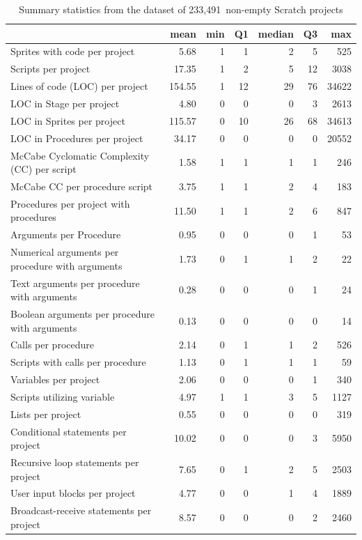\documentclass{sig-alternate}
\newcommand{\nScriptPrograms}{233,491}
\begin{document}
\begin{table}[ht]
	\centering
	\begin{tabular}{lrrrrrr}
		\hline
		&\textbf{mean}&\textbf{min}&\textbf{Q1}&\textbf{median}&\textbf{Q3}&\textbf{max}\\
		\hline
		Sprites with code per project&5.68&1&1&2&5&525\\
		Scripts per project&17.35&1&2&5&12&3038\\
		Lines of code (LOC) per project&154.55&1&12&29&76&34622\\
		LOC in Stage per project&4.80&0&0&0&3&2613\\
		LOC in Sprites per project&115.57&0&10&26&68&34613\\
		LOC in Procedures per project&34.17&0&0&0&0&20552\\
		McCabe Cyclomatic Complexity (CC) per script&1.58&1&1&1&1&246\\
		McCabe CC per procedure script&3.75&1&1&2&4&183\\
		Procedures per project with procedures&11.50&1&1&2&6&847\\
		Arguments per Procedure&0.95&0&0&0&1&53\\
		Numerical arguments per procedure with arguments&1.73&0&1&1&2&22\\
		Text arguments per procedure with arguments&0.28&0&0&0&1&24\\
		Boolean arguments per procedure with arguments&0.13&0&0&0&0&14\\
		Calls per procedure&2.14&0&1&1&2&526\\
		Scripts with calls per procedure&1.13&0&1&1&1&59\\
		Variables per project&2.06&0&0&0&1&340\\
		Scripts utilizing variable&4.97&1&1&3&5&1127\\
		Lists per project&0.55&0&0&0&0&319\\
		Conditional statements per project&10.02&0&0&0&3&5950\\
		Recursive loop statements per project&7.65&0&1&2&5&2503\\
		User input blocks per project&4.77&0&0&1&4&1889\\
		Broadcast-receive statements per project&8.57&0&0&0&2&2460\\	
		\hline
	\end{tabular}
	\caption{Summary statistics from the dataset of \nScriptPrograms~non-empty Scratch projects}
	\label{tbl-size}
\end{table}
\end{document}

